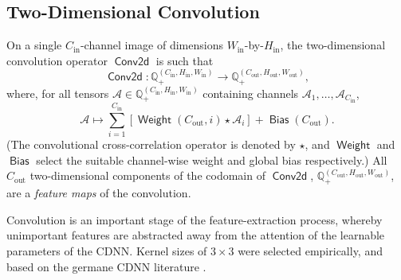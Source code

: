 \documentclass[journal]{IEEEtran}
\DeclareMathOperator\convol{\mathsf{Conv2d}}
\DeclareMathOperator\weight{\mathsf{Weight}}
\DeclareMathOperator\bias{\mathsf{Bias}}
\begin{document}
\subsection{Two-Dimensional Convolution}
On a single $C_\text{in}$-channel image of dimensions
$W_\text{in}$-by-$H_\text{in}$, the two-dimensional convolution operator
$\convol$ is such that
\begin{equation}
    \convol \colon
        \mathbb{Q}^{\left( C_\text{in}, H_\text{in}, W_\text{in} \right)}_+ \to
        \mathbb{Q}^{\left( C_\text{out}, H_\text{out}, W_\text{out} \right)}_+,
\end{equation}
where, for all tensors $\mathcal{A} \in \mathbb{Q}^{\left( C_\text{in},
H_\text{in}, W_\text{in} \right)}_+$ containing channels $\mathcal{A}_1, \ldots,
\mathcal{A}_{C_\text{in}}$,
\begin{equation}
    \mathcal{A} \mapsto \sum_{i=1}^{C_\text{in}} \left[
            \weight\left(C_\text{out}, i\right) \star \mathcal{A}_i
        \right] + \bias(C_\text{out}).
    \label{eqn:convolution}
\end{equation}
(The convolutional cross-correlation operator is denoted by $\star$, and
$\weight$ and $\bias$ select the suitable channel-wise weight and global bias
respectively.) All $C_\text{out}$ two-dimensional components of the codomain
of $\convol$, $\mathbb{Q}^{\left( C_\text{out}, H_\text{out}, W_\text{out}
\right)}_+$, are a \emph{feature maps} of the convolution.

Convolution is an important stage of the feature-extraction process, whereby
unimportant features are abstracted away from the attention of the learnable
parameters of the CDNN. Kernel sizes of $3 \times 3$ were selected empirically,
and based on the germane CDNN literature \cite{Wang:2016}.
\end{document}

